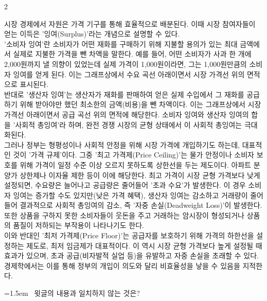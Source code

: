 \documentclass[10pt, a4paper]{article}
\begin{document}
\begin{multicols}{2}
\begin{passagebox}
\noindent{}시장 경제에서 자원은 가격 기구를 통해 효율적으로 배분된다. 이때 시장 참여자들이 얻는 이득은 '잉여(Surplus)'라는 개념으로 설명할 수 있다. \\
'소비자 잉여'란 소비자가 어떤 재화를 구매하기 위해 지불할 용의가 있는 최대 금액에서 실제로 지불한 가격을 뺀 차액을 말한다. 예를 들어, 어떤 소비자가 사과 한 개에 2,000원까지 낼 의향이 있었는데 실제 가격이 1,000원이라면, 그는 1,000원만큼의 소비자 잉여를 얻게 된다. 이는 그래프상에서 수요 곡선 아래이면서 시장 가격선 위의 면적으로 표시된다. \\
반대로 '생산자 잉여'는 생산자가 재화를 판매하여 얻은 실제 수입에서 그 재화를 공급하기 위해 받아야만 했던 최소한의 금액(비용)을 뺀 차액이다. 이는 그래프상에서 시장 가격선 아래이면서 공급 곡선 위의 면적에 해당한다. 소비자 잉여와 생산자 잉여의 합을 '사회적 총잉여'라 하며, 완전 경쟁 시장의 균형 상태에서 이 사회적 총잉여는 극대화된다.
\\[0.5em]
그러나 정부는 형평성이나 사회적 안정을 위해 시장 가격에 개입하기도 하는데, 대표적인 것이 '가격 규제'이다. 그중 '최고 가격제(Price Ceiling)'는 물가 안정이나 소비자 보호를 위해 가격이 일정 수준 이상 오르지 못하도록 상한선을 두는 제도이다. 아파트 분양가 상한제나 이자율 제한 등이 이에 해당한다. 최고 가격이 시장 균형 가격보다 낮게 설정되면, 수요량은 늘어나고 공급량은 줄어들어 '초과 수요'가 발생한다. 이 경우 소비자 잉여는 증가할 수도 있지만(낮은 가격 혜택), 생산자 잉여는 감소하고 거래량이 줄어들어 결과적으로 사회적 총잉여의 감소, 즉 '자중 손실(Deadweight Loss)'이 발생한다. 또한 상품을 구하지 못한 소비자들이 웃돈을 주고 거래하는 암시장이 형성되거나 상품의 품질이 저하되는 부작용이 나타나기도 한다.
\\[0.5em]
이와 반대인 '최저 가격제(Price Floor)'는 공급자를 보호하기 위해 가격의 하한선을 설정하는 제도로, 최저 임금제가 대표적이다. 이 역시 시장 균형 가격보다 높게 설정될 때 효과가 있으며, 초과 공급(비자발적 실업 등)을 유발하고 자중 손실을 초래할 수 있다. 경제학에서는 이를 통해 정부의 개입이 의도와 달리 비효율성을 낳을 수 있음을 지적한다.
\end{passagebox}
\vspace{1mm}

\noindent\begin{minipage}{\columnwidth}
\vspace{2mm}
{\hangindent=1.5em  ~윗글의 내용과 일치하지 않는 것은?\par}


\end{minipage}
\end{multicols}
\end{document}
